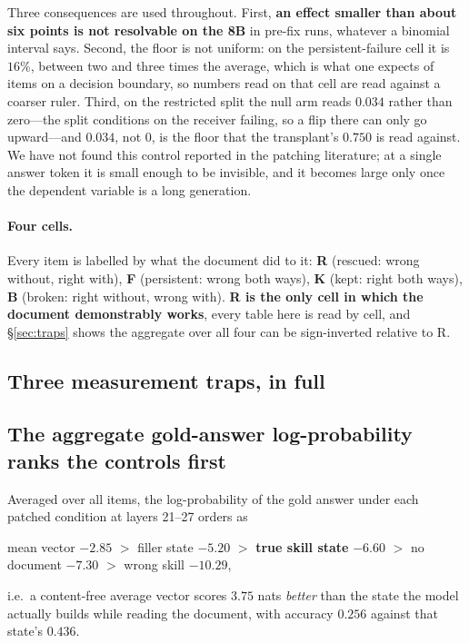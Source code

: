 \documentclass{article}
\begin{document}
Three consequences are used throughout. First, \textbf{an effect smaller than
about six points is not resolvable on the 8B} in pre-fix runs, whatever a
binomial interval says. Second, the floor is not uniform: on the
persistent-failure cell it is $16\%$, between two and three times the average,
which is what one expects of items on a
decision boundary, so numbers read on that cell are read against a coarser
ruler. Third, on the restricted split the null arm reads $0.034$ rather than
zero---the split conditions on the receiver failing, so a flip there can only go
upward---and $0.034$, not $0$, is the floor that the transplant's $0.750$ is
read against. We have not found this control reported in the patching
literature; at a single answer token it is small enough to be invisible, and it
becomes large only once the dependent variable is a long generation.

\paragraph{Four cells.}

Every item is labelled by what the document did to it: \textbf{R} (rescued:
wrong without, right with), \textbf{F} (persistent: wrong both ways), \textbf{K}
(kept: right both ways), \textbf{B} (broken: right without, wrong with).
\textbf{R is the only cell in which the document demonstrably works}, every table
here is read by cell, and \S\ref{sec:traps} shows the aggregate over all four can
be sign-inverted relative to R.




\subsection{Three measurement traps, in full}
\label{app:traps}

\subsection{The aggregate gold-answer log-probability ranks the controls first}

Averaged over all items, the log-probability of the gold answer under each
patched condition at layers 21--27 orders as
\begin{center}
mean vector $-2.85$ \; $>$ \; filler state $-5.20$ \; $>$ \; \textbf{true skill
state} $-6.60$ \; $>$ \; no document $-7.30$ \; $>$ \; wrong skill $-10.29$,
\end{center}
i.e.\ a content-free average vector scores $3.75$ nats \emph{better} than the
state the model actually builds while reading the document, with accuracy
$0.256$ against that state's $0.436$.
\end{document}
